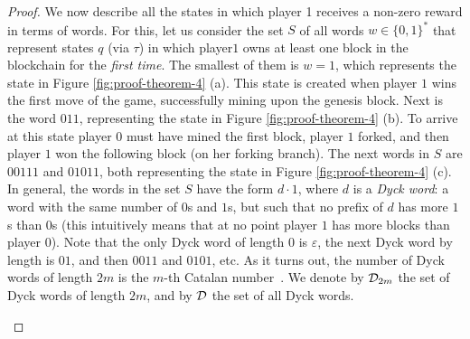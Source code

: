 \begin{proof}
We now describe all the states in which player 1 receives a non-zero reward in terms of words. For this, let us consider the set $S$ of all words $w \in \{0,1\}^*$ that represent states $q$ (via $\tau$) in which player$1$ owns at least one block in the blockchain for the {\em first time}. 
The smallest of them is $w = 1$, which represents the state in Figure \ref{fig:proof-theorem-4} (a). This state is created when player $1$ wins the first move of the game, successfully mining upon the genesis block. Next is the word $011$, representing the state in Figure \ref{fig:proof-theorem-4} (b). To arrive at this state player $0$ must have mined the first block, player $1$ forked, and then player $1$ 
won the following block (on her forking branch). The next words in $S$ are $00111$ and $01011$, both representing the state in Figure \ref{fig:proof-theorem-4} (c). 
In general, the words in the set $S$ have the form $d\cdot 1$, where $d$ is a \emph{Dyck word}: a word with the same number of $0$s and $1$s, but such that 
no prefix of $d$ has more $1$s than $0$s (this intuitively means that at no point player $1$ has more blocks than player $0$). Note that the only Dyck word of length $0$ is $\varepsilon$, the next Dyck word by length is $01$, and then $0011$ and $0101$, etc. As it turns out, the number of Dyck words of length $2m$ is the $m$-th Catalan number~\cite{stanley2015catalan}. We denote by $\Dyck_{2m}$ the set of Dyck words of length $2m$, and by $\Dyck$ the set of all Dyck words.

\begin{figure}
%
%
%
%
%	
%
%
%	
%	
%
\begin{center}
\begin{tikzpicture}[->,>=stealth',auto,thick, scale = 0.61,state/.style={circle,inner sep=2pt}]


\end{tikzpicture}
\end{center}
\end{figure}
\end{proof}

